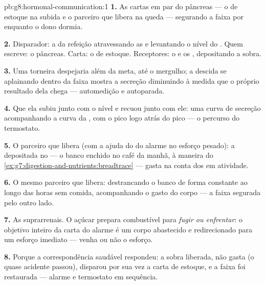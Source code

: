 \begin{solution}{pb:g8:hormonal-communication:1}
\textbf{1.} As cartas em par do pâncreas --- o  de estoque na
subida e o parceiro que libera na queda --- segurando a faixa por
 enquanto o dono dormia.

\textbf{2.} Disparador: a  da refeição atravessando as
 e levantando o nível do . Quem escreve: o pâncreas.
Carta: o  de estoque. Receptores: o  e os ,
depositando a sobra.

\textbf{3.} Uma torneira despejaria além da meta, até o mergulho; a
descida se aplainando dentro da faixa mostra a secreção diminuindo à
medida que o próprio resultado dela chega --- automedição e
autoparada.

\textbf{4.} Que ela subiu junto com o nível e recuou junto com ele:
uma curva de secreção acompanhando a curva da , com o pico
logo atrás do pico --- o percurso do termostato.

\textbf{5.} O parceiro que libera (com a ajuda do  do alarme
no esforço pesado): a  depositada no  --- o banco enchido
no café da manhã, à maneira do
\cref{ex:g7:digestion-and-nutrients:breadtrace} --- gasta na conta dos
 em atividade.

\textbf{6.} O mesmo parceiro que libera: destrancando o banco de forma
constante ao longo das horas sem comida, acompanhando o gasto do corpo
--- a faixa segurada pelo outro lado.

\textbf{7.} As  suprarrenais. O açúcar prepara combustível
para \emph{fugir ou enfrentar}: o objetivo inteiro da carta do alarme
é um corpo abastecido e redirecionado para um esforço imediato ---
venha ou não o esforço.

\textbf{8.} Porque a correspondência saudável respondeu: a sobra
liberada, não gasta (o quase acidente passou), disparou por sua vez a
carta de estoque, e a faixa foi restaurada --- alarme e termostato em
sequência.


\end{solution}
